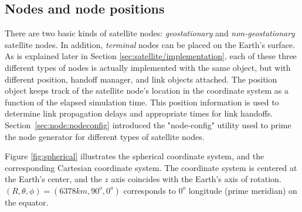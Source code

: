 
\subsection{Nodes and node positions}
\label{sec:satellite/usage/nodes}

There are two basic kinds of satellite nodes:  {\em geostationary}  
and {\em non-geostationary} satellite nodes.  In addition, {\em terminal} nodes
can be placed on the Earth's surface.  As is explained later in 
Section \ref{sec:satellite/implementation},
each of these three different types of nodes is actually implemented with 
the same  object, but with different position,
handoff manager,  and link objects attached.  
The position object keeps track of the satellite node's location 
in the coordinate system as a function of the elapsed simulation time.
This position information is used to determine link propagation delays and
appropriate times for link handoffs.  Section~\ref{sec:node:nodeconfig} 
introduced the 
"node-config" utility used to prime the node generator for different
types of satellite nodes. 

Figure \ref{fig:spherical} illustrates the spherical coordinate system,
and the corresponding Cartesian coordinate system.
The coordinate system is centered at the 
Earth's center, and the $z$ axis coincides with the Earth's axis of rotation.  
$(R,\theta,\phi) = (6378 km, 90^o, 0^o)$ corresponds to $0^o$ longitude 
(prime meridian) on the equator.

